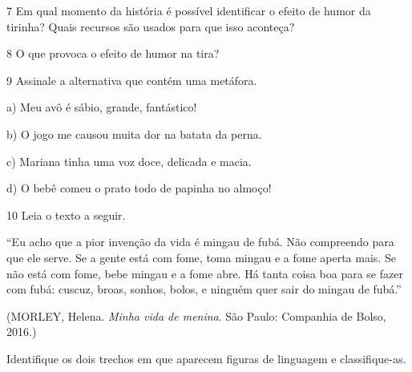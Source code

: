 {


\num{7} Em qual momento da história é possível identificar o efeito de
humor da tirinha? Quais recursos são usados para que isso aconteça?



\num{8} O que provoca o efeito de humor na tira?



\num{9} Assinale a alternativa que contém uma metáfora.

a) Meu avô é sábio, grande, fantástico!

b) O jogo me causou muita dor na batata da perna.

c) Mariana tinha uma voz doce, delicada e macia.

d) O bebê comeu o prato todo de papinha no almoço!


\num{10} Leia o texto a seguir.

``Eu acho que a pior invenção da vida é mingau de fubá. Não compreendo
para que ele serve. Se a gente está com fome, toma mingau e a fome
aperta mais. Se não está com fome, bebe mingau e a fome abre. Há tanta
coisa boa para se fazer com fubá: cuscuz, broas, sonhos, bolos, e
ninguém quer sair do mingau de fubá.''

(MORLEY, Helena. \emph{Minha vida de menina}. São Paulo: Companhia de
Bolso, 2016.)

Identifique os dois trechos em que aparecem figuras de linguagem e
classifique-as.



}
